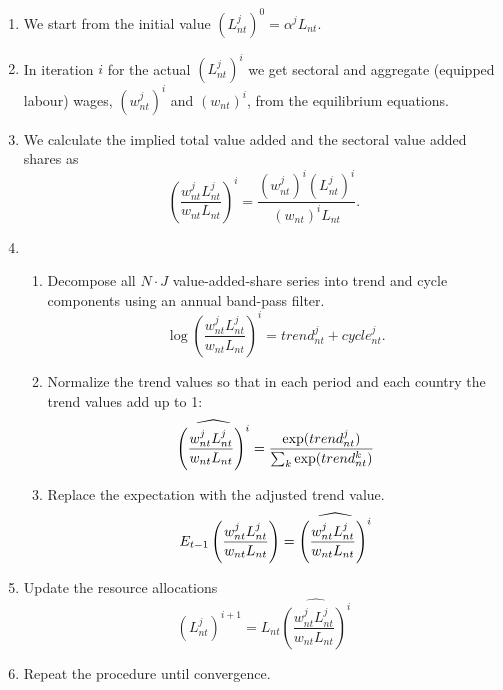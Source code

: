\documentclass{article}
\begin{document}
\begin{enumerate}
\item We start from the initial value $(L_{nt}^j)^0 = \alpha^j L_{nt}$.

\item In iteration $i$ for the actual $(L_{nt}^{j})^{i}$ we get sectoral and
aggregate (equipped labour) wages, $(w_{nt}^{j})^{i}$ and $(w_{nt})^{i}$,
from the equilibrium equations.

\item We calculate the implied total value added and the sectoral value
added shares as 
\begin{equation*}
\left(\frac{w_{nt}^j L_{nt}^j}{w_{nt} L_{nt}}\right)^i = \frac{(w_{nt}^j)^i
(L_{nt}^j)^i}{(w_{nt})^i L_{nt}}. 
\end{equation*}

\item 
\begin{enumerate}
\item Decompose all $N\cdot J$ value-added-share series into trend and cycle
components using an annual band-pass filter. 
\begin{equation*}
\log \left( \frac{w_{nt}^{j}L_{nt}^{j}}{w_{nt}L_{nt}}\right)
^{i}=trend_{nt}^{j}+cycle_{nt}^{j}. 
\end{equation*}

\item Normalize the trend values so that in each period and each country the
trend values add up to 1: 
\begin{equation*}
\widehat{\left( \frac{w_{nt}^{j}L_{nt}^{j}}{w_{nt}L_{nt}}\right) ^{i}}=\frac{%
\exp (trend_{nt}^{j})}{\sum_{k}\exp (trend_{nt}^{k})} 
\end{equation*}

\item Replace the expectation with the adjusted trend value. 
\begin{equation*}
E_{t - 1} \left( \frac{w_{nt}^j L_{nt}^j}{w_{nt} L_{nt}}\right) = \widehat{%
\left(\frac{w_{nt}^j L_{nt}^j}{w_{nt} L_{nt}}\right)^i} 
\end{equation*}
\end{enumerate}

\item Update the resource allocations 
\begin{equation*}
(L_{nt}^j)^{i + 1} = L_{nt} \widehat{\left(\frac{w_{nt}^j L_{nt}^j}{w_{nt}
L_{nt}}\right)^i} 
\end{equation*}

\item Repeat the procedure until convergence.
\end{enumerate}
\end{document}
